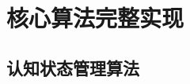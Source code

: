 \documentclass[12pt,a4paper]{article}
\begin{document}


\appendix
\section{核心算法完整实现}

\subsection{认知状态管理算法}
\end{document}
